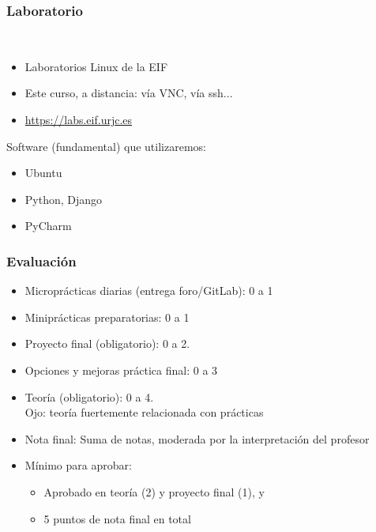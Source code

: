 \begin{frame}
\frametitle{Laboratorio}

~
\vspace{1cm}

\begin{itemize}
\item Laboratorios Linux de la EIF
\item Este curso, a distancia: vía VNC, vía ssh...
\item \url{https://labs.eif.urjc.es}
\end{itemize}

\vspace{1cm}

Software (fundamental) que utilizaremos:

\begin{itemize}
\item Ubuntu
\item Python, Django
\item PyCharm
\end{itemize}
\end{frame}
\usebackgroundtemplate{}



\begin{frame}
\frametitle{Evaluación}

\begin{itemize}
\item Microprácticas diarias (entrega foro/GitLab): 0 a 1
\item Miniprácticas preparatorias: 0 a 1
\item Proyecto final (obligatorio): 0 a 2.
\item Opciones y mejoras práctica final: 0 a 3
\item Teoría (obligatorio): 0 a 4. \\
  \hspace{.5cm} Ojo: teoría fuertemente relacionada con prácticas
\item Nota final: Suma de notas, moderada por la interpretación del profesor
\item Mínimo para aprobar:
      \begin{itemize}
      \item Aprobado en teoría (2) y proyecto final (1), y
      \item 5 puntos de nota final en total
      \end{itemize}
\end{itemize}

\end{frame}

